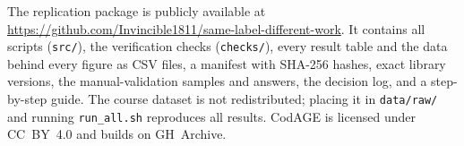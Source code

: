 The replication package is publicly available at \url{https://github.com/Invincible1811/same-label-different-work}. It contains all scripts (\texttt{src/}), the verification checks (\texttt{checks/}), every result table and the data behind every figure as CSV files, a manifest with SHA-256 hashes, exact library versions, the manual-validation samples and answers, the decision log, and a step-by-step guide. The course dataset is not redistributed; placing it in \texttt{data/raw/} and running \texttt{run\_all.sh} reproduces all results. CodAGE is licensed under CC~BY~4.0 and builds on GH~Archive.
